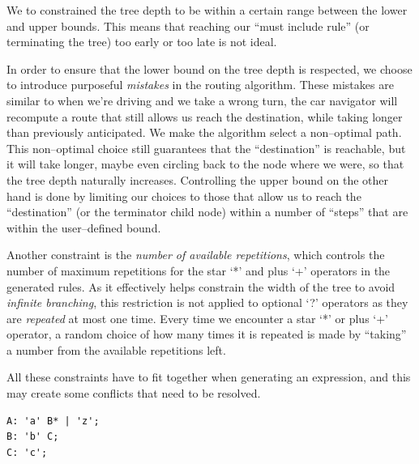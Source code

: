 \documentclass[]{usiinfbachelorproject}
\begin{document}
We to constrained the tree depth to be within a certain range between the lower
and upper bounds. This means that reaching our ``must include rule'' (or
terminating the tree) too early or too late is not ideal.

In order to ensure that the lower bound on the tree depth is respected,
we choose to introduce purposeful \textit{mistakes} in the routing algorithm.
These mistakes are similar to when we're driving and we take a wrong turn, the
car navigator will recompute a route that still allows us reach the destination,
while taking longer than previously anticipated.
We make the algorithm select a non–optimal path. This non–optimal choice
still guarantees that the ``destination'' is reachable, but it will take
longer, maybe even circling back to the node where we were, so that the tree
depth naturally increases.
Controlling the upper bound on the other hand is done by limiting our choices
to those that allow us to reach the ``destination'' (or the terminator child
node) within a number of ``steps'' that are within the user–defined bound.

Another constraint is the \textit{number of available repetitions}, which
controls the number of maximum repetitions for the star `*' and plus `+'
operators in the generated rules. As it effectively helps constrain the width of
the tree to avoid \textit{infinite branching}, this restriction is not applied
to optional `?' operators as they are \textit{repeated} at most one time.
Every time we encounter a star `*' or plus `+' operator, a random choice of how
many times it is repeated is made by ``taking'' a number from the available
repetitions left.

All these constraints have to fit together when generating an expression, and
this may create some conflicts that need to be resolved.

\begin{lstlisting}[caption={Fulfilling rule inclusion and max repetitions
                            constraints},
                   label={impl-expr-const-combo-1},
                   style=antlr]
A: 'a' B* | 'z';
B: 'b' C;
C: 'c';
\end{lstlisting}
\end{document}
